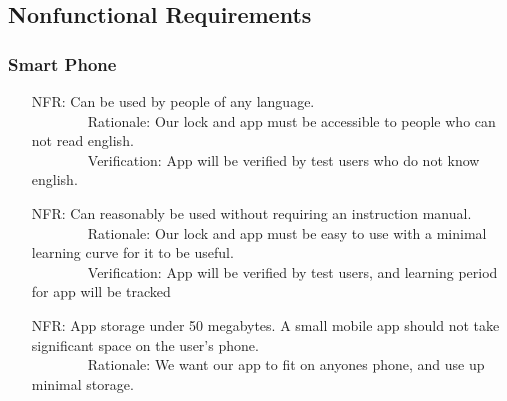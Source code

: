 \documentclass[12pt]{article}
\newcounter{nfrnum} %
\begin{document}
\subsection{Nonfunctional Requirements}

\subsubsection{Smart Phone}
\begin{itemize}
\setlength{\itemindent}{.5in}
\item[NFR\refstepcounter{nfrnum}\thenfrnum\label{NFR1}:] Can be used by people of any language.
\\ \-\ \-\ \-\ \-\ \-\ \-\ \-\ \-\ Rationale: Our lock and app must be accessible to people who can not read english.
\\ \-\ \-\ \-\ \-\ \-\ \-\ \-\ \-\ Verification: App will be verified by test users who do not know english.
\item[NFR\refstepcounter{nfrnum}\thenfrnum\label{NFR2}:] Can reasonably be used without requiring an instruction manual.
\\ \-\ \-\ \-\ \-\ \-\ \-\ \-\ \-\ Rationale: Our lock and app must be easy to use with a minimal learning curve for it to be useful.
\\ \-\ \-\ \-\ \-\ \-\ \-\ \-\ \-\ Verification: App will be verified by test users, and learning period for app will be tracked
\item[NFR\refstepcounter{nfrnum}\thenfrnum\label{NFR3}:] App storage under 50 megabytes. A small mobile app should not take significant space on the user's phone.
\\ \-\ \-\ \-\ \-\ \-\ \-\ \-\ \-\ Rationale: We want our app to fit on anyones phone, and use up minimal storage.
\end{itemize}
\end{document}
